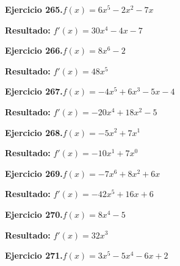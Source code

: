 \documentclass[10pt,a4paper]{article}
\begin{document}
\newpage
\begin{ejbox}
\textbf{Ejercicio 265.}\quad $f(x) = 6x^{5} -2x^2 -7x$
\end{ejbox}

\begin{solbox}
\textbf{Resultado:} \(\displaystyle f'(x) = 30x^{4} -4x -7\)
\end{solbox}

\begin{ejbox}
\textbf{Ejercicio 266.}\quad $f(x) = 8x^{6} -2$
\end{ejbox}

\begin{solbox}
\textbf{Resultado:} \(\displaystyle f'(x) = 48x^{5}\)
\end{solbox}

\begin{ejbox}
\textbf{Ejercicio 267.}\quad $f(x) = -4x^{5} +6x^{3} -5x -4$
\end{ejbox}

\begin{solbox}
\textbf{Resultado:} \(\displaystyle f'(x) = -20x^{4} +18x^{2} -5\)
\end{solbox}

\newpage
\begin{ejbox}
\textbf{Ejercicio 268.}\quad $f(x) = -5x^{2} + 7x^{1}$
\end{ejbox}

\begin{solbox}
\textbf{Resultado:} \(\displaystyle f'(x) = -10x^{1} + 7x^{0}\)
\end{solbox}

\begin{ejbox}
\textbf{Ejercicio 269.}\quad $f(x) = -7x^{6} +8x^2 +6x$
\end{ejbox}

\begin{solbox}
\textbf{Resultado:} \(\displaystyle f'(x) = -42x^{5} +16x +6\)
\end{solbox}

\begin{ejbox}
\textbf{Ejercicio 270.}\quad $f(x) = 8x^{4} -5$
\end{ejbox}

\begin{solbox}
\textbf{Resultado:} \(\displaystyle f'(x) = 32x^{3}\)
\end{solbox}

\newpage
\begin{ejbox}
\textbf{Ejercicio 271.}\quad $f(x) = 3x^{5} -5x^{4} -6x +2$
\end{ejbox}
\end{document}
